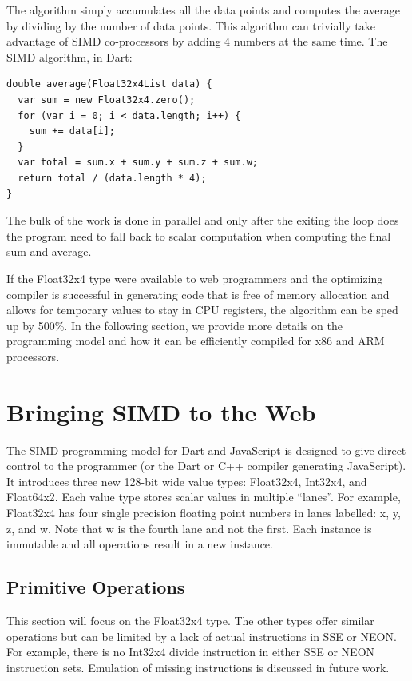 \documentclass[preprint]{sigplanconf}
\begin{document}
The algorithm simply accumulates all the data points and computes the average by
dividing by the number of data points. This algorithm can trivially take
advantage of SIMD co-processors by adding 4 numbers at the same time. The SIMD
algorithm, in Dart:

\begin{small}
\begin{lstlisting}
double average(Float32x4List data) {
  var sum = new Float32x4.zero();
  for (var i = 0; i < data.length; i++) {
    sum += data[i];
  }
  var total = sum.x + sum.y + sum.z + sum.w;
  return total / (data.length * 4);
}
\end{lstlisting}
\end{small}

The bulk of the work is done in parallel and only after the exiting the loop
does the program need to fall back to scalar computation when computing the
final sum and average.

If the Float32x4 type were available to web programmers and the optimizing
compiler is successful in generating code that is free of memory allocation and
allows for temporary values to stay in CPU registers, the algorithm can be sped
up by 500\%. In the following section, we provide more details on the
programming model and how it can be efficiently compiled for x86 and ARM
processors.

\section{Bringing SIMD to the Web}

The SIMD programming model for Dart and JavaScript is designed to give direct
control to the programmer (or the Dart or C++ compiler generating JavaScript).
It introduces three new 128-bit wide value types: Float32x4, Int32x4, and
Float64x2. Each value type stores scalar values in multiple ``lanes''. For
example, Float32x4 has four single precision floating point numbers in lanes
labelled: x, y, z, and w. Note that w is the fourth lane and not the first. Each
instance is immutable and all operations result in a new instance.

\subsection{Primitive Operations}

This section will focus on the Float32x4 type. The other types offer similar
operations but can be limited by a lack of actual instructions in SSE or NEON.
For example, there is no Int32x4 divide instruction in either SSE or NEON
instruction sets. Emulation of missing instructions is discussed in future work.
\end{document}
